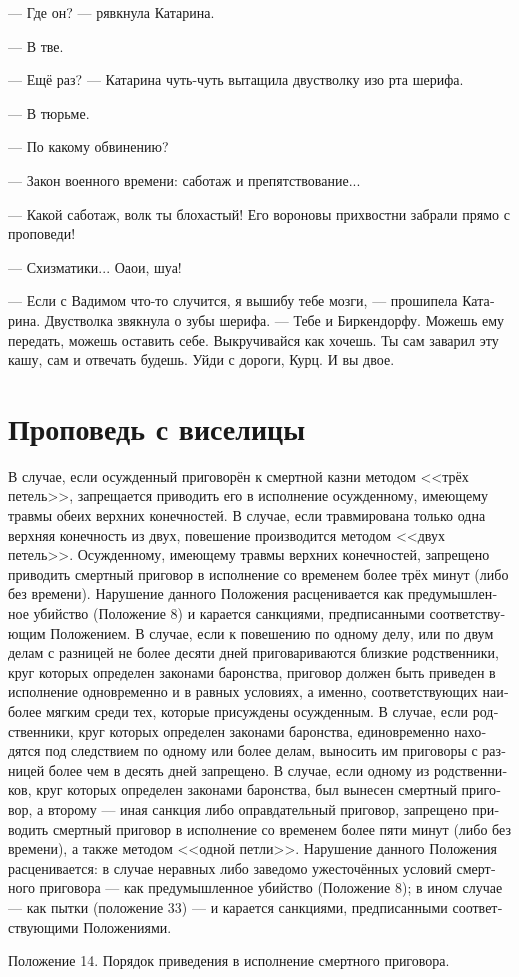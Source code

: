 \documentclass[a4paper,12pt,fleqn]{book}\usepackage{polyglossia}\setdefaultlanguage[babelshorthands=true]{russian}\setotherlanguage{english}\defaultfontfeatures{Ligatures=TeX,Mapping=tex-text}\usepackage{xcolor}\newcommand{\ml}[3]{#2}
\begin{document}
--- Где он? --- рявкнула Катарина.

--- В тве.

--- Ещё раз? --- Катарина чуть-чуть вытащила двустволку изо рта шерифа.

--- В тюрьме.

--- По какому обвинению?

--- Закон военного времени: саботаж и препятствование...

--- Какой саботаж, волк ты блохастый!
Его вороновы прихвостни забрали прямо с проповеди!

--- Схизматики...
Оаои, шуа!

--- Если с Вадимом что-то случится, я вышибу тебе мозги, --- прошипела Катарина.
Двустволка звякнула о зубы шерифа.
--- Тебе и Биркендорфу.
Можешь ему передать, можешь оставить себе.
Выкручивайся как хочешь.
Ты сам заварил эту кашу, сам и отвечать будешь.
Уйди с дороги, Курц.
И вы двое.

\section{Проповедь с виселицы}

\epigraph{
В случае, если осужденный приговорён к смертной казни методом <<трёх петель>>, запрещается приводить его в исполнение осужденному, имеющему травмы обеих верхних конечностей.
В случае, если травмирована только одна верхняя конечность из двух, повешение производится методом <<двух петель>>.
Осужденному, имеющему травмы верхних конечностей, запрещено приводить смертный приговор в исполнение со временем более трёх минут (либо без времени).
Нарушение данного Положения расценивается как предумышленное убийство (Положение 8) и карается санкциями, предписанными соответствующим Положением.
В случае, если к повешению по одному делу, или по двум делам с разницей не более десяти дней приговариваются близкие родственники, круг которых определен законами баронства, приговор должен быть приведен в исполнение одновременно и в равных условиях, а именно, соответствующих наиболее мягким среди тех, которые присуждены осужденным.
В случае, если родственники, круг которых определен законами баронства, единовременно находятся под следствием по одному или более делам, выносить им приговоры с разницей более чем в десять дней запрещено.
В случае, если одному из родственников, круг которых определен законами баронства, был вынесен смертный приговор, а второму --- иная санкция либо оправдательный приговор, запрещено приводить смертный приговор в исполнение со временем более пяти минут (либо без времени), а также методом <<одной петли>>.
Нарушение данного Положения расценивается: в случае неравных либо заведомо ужесточённых условий смертного приговора --- как предумышленное убийство (Положение 8); в ином случае --- как пытки (положение 33) --- и карается санкциями, предписанными соответствующими Положениями.
}{
Положение 14.
Порядок приведения в исполнение смертного приговора.
}
\end{document}
